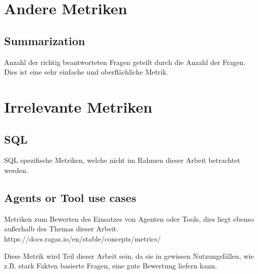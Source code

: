 \section{Andere Metriken}
\subsection{Summarization}
Anzahl der richtig beantworteten Fragen geteilt durch die Anzahl der Fragen. Dies ist eine sehr einfache und oberflächliche Metrik.


\section{Irrelevante Metriken}
\subsection{SQL}
SQL spezifische Metriken, welche nicht im Rahmen dieser Arbeit betrachtet werden.

\subsection{Agents or Tool use cases}
Metriken zum Bewerten des Einsatzes von Agenten oder Tools, dies liegt ebenso außerhalb des Themas dieser Arbeit.
https://docs.ragas.io/en/stable/concepts/metrics/

Diese Metrik wird Teil dieser Arbeit sein, da sie in gewissen Nutzungsfällen, wie z.B. stark Fakten basierte Fragen, eine gute Bewertung liefern kann.